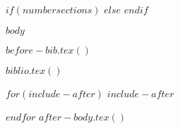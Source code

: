 \maketitle
$if(numbersections)$
\setcounter{secnumdepth}{$if(secnumdepth)$$secnumdepth$$else$5$endif$}
$else$
\setcounter{secnumdepth}{-\maxdimen} %
$endif$

\setlength\LTleft{0pt}

$body$

$before-bib.tex()$


$biblio.tex()$

$for(include-after)$
$include-after$

$endfor$
$after-body.tex()$



